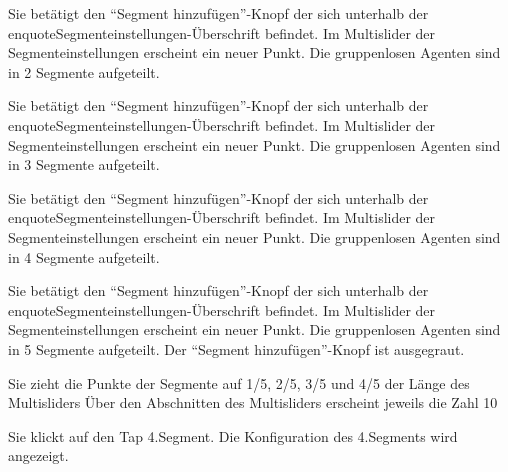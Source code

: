 \documentclass[parskip=full,11pt]{scrartcl}
\begin{document}
{Sie betätigt den \enquote{Segment hinzufügen}-Knopf der sich unterhalb der enquote{Segmenteinstellungen}-Überschrift befindet.}
{Im Multislider der Segmenteinstellungen erscheint ein neuer Punkt. Die gruppenlosen Agenten sind in 2 Segmente aufgeteilt.}

{Sie betätigt den \enquote{Segment hinzufügen}-Knopf der sich unterhalb der enquote{Segmenteinstellungen}-Überschrift befindet.}
{Im Multislider der Segmenteinstellungen erscheint ein neuer Punkt. Die gruppenlosen Agenten sind in 3 Segmente aufgeteilt.}

{Sie betätigt den \enquote{Segment hinzufügen}-Knopf der sich unterhalb der enquote{Segmenteinstellungen}-Überschrift befindet.}
{Im Multislider der Segmenteinstellungen erscheint ein neuer Punkt. Die gruppenlosen Agenten sind in 4 Segmente aufgeteilt.}

{Sie betätigt den \enquote{Segment hinzufügen}-Knopf der sich unterhalb der enquote{Segmenteinstellungen}-Überschrift befindet.}
{Im Multislider der Segmenteinstellungen erscheint ein neuer Punkt. Die gruppenlosen Agenten sind in 5 Segmente aufgeteilt. Der \enquote{Segment hinzufügen}-Knopf ist ausgegraut.}

{Sie zieht die Punkte der Segmente auf 1/5, 2/5, 3/5 und 4/5 der Länge des Multisliders}
{Über den Abschnitten des Multisliders erscheint jeweils die Zahl 10}

{Sie klickt auf den Tap 4.Segment.}
{Die Konfiguration des 4.Segments wird angezeigt.}
\end{document}
